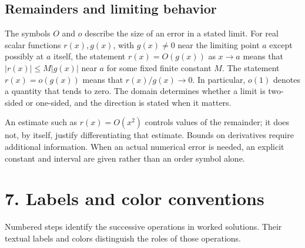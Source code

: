 \documentclass[11pt,oneside,openany]{book}
\begin{document}
\subsection{Remainders and limiting behavior}

The symbols \(O\) and \(o\) describe the size of an error in a stated limit. For real
scalar functions \(r(x),g(x)\), with \(g(x)\ne0\) near the limiting point \(a\) except
possibly at \(a\) itself, the statement \(r(x)=O(g(x))\) as \(x\to a\) means that
\(|r(x)|\le M|g(x)|\) near \(a\) for some fixed finite constant \(M\). The statement
\(r(x)=o(g(x))\) means that \(r(x)/g(x)\to0\). In particular, \(o(1)\) denotes a quantity
that tends to zero. The domain determines whether a limit is two-sided or
one-sided, and the direction is stated when it matters.

An estimate such as \(r(x)=O(x^2)\) controls values of the remainder; it does not,
by itself, justify differentiating that estimate. Bounds on derivatives require
additional information. When an actual numerical error is needed, an explicit
constant and interval are given rather than an order symbol alone.
\clearpage

\section{7. Labels and color conventions}

Numbered steps identify the successive operations in worked solutions.
Their textual labels and colors distinguish the roles of those operations.
\end{document}
